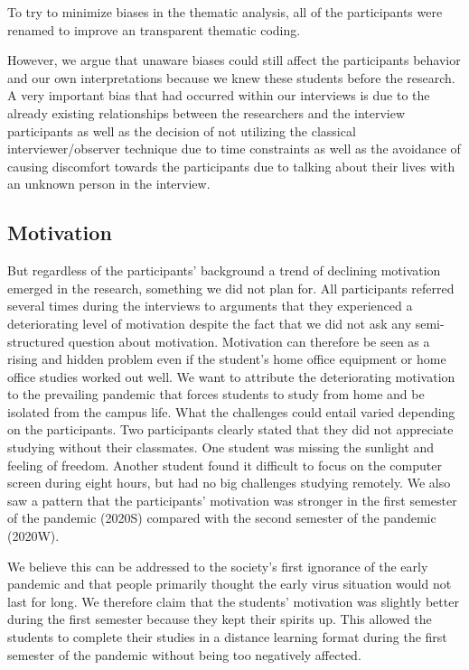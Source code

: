\documentclass{sigchi}
\begin{document}
To try to minimize biases in the thematic analysis, all of the participants were renamed to improve an transparent thematic coding. 

However, we argue that unaware biases could still affect the participants behavior and our own interpretations because we knew these students before the research.
A very important bias that had occurred within our interviews is due to the already existing relationships between the researchers and the interview participants as well as the decision of not utilizing the classical interviewer/observer technique due to time constraints as well as the avoidance of causing discomfort towards the participants due to talking about their lives with an unknown person in the interview.

\subsection{Motivation}
But regardless of the participants' background a trend of declining motivation emerged in the research, something we did not plan for. All participants referred several times during the interviews to arguments that they experienced a deteriorating level of motivation despite the fact that we did not ask any semi-structured question about motivation. Motivation can therefore be seen as a rising and hidden problem even if the student's home office equipment or home office studies worked out well. We want to attribute the deteriorating motivation to the prevailing pandemic that forces students to study from home and be isolated from the campus life. What the challenges could entail varied depending on the participants. Two participants clearly stated that they did not appreciate studying without their classmates. One student was missing the sunlight and feeling of freedom. Another student found it difficult to focus on the computer screen during eight hours, but had no big challenges studying remotely. We also saw a pattern that the participants' motivation was stronger in the first semester of the pandemic (2020S) compared with the second semester of the pandemic (2020W).

We believe this can be addressed to the society’s first ignorance of the early pandemic and that people primarily thought the early virus situation would not last for long. We therefore claim that the students' motivation was slightly better during the first semester because they kept their spirits up. This allowed the students to complete their studies in a distance learning format during the first semester of the pandemic without being too negatively affected.
\end{document}
